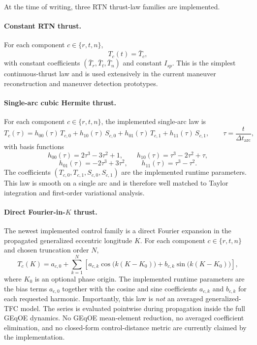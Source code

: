 \documentclass[11pt]{article}
\begin{document}
At the time of writing, three RTN thrust-law families are implemented.

\paragraph{Constant RTN thrust.}
For each component $c\in\{r,t,n\}$,
\begin{equation}
    T_c(t) = \bar{T}_c,
\end{equation}
with constant coefficients $(\bar{T}_r,\bar{T}_t,\bar{T}_n)$ and constant
$I_{sp}$. This is the simplest continuous-thrust law and is used extensively in
the current maneuver reconstruction and maneuver detection prototypes.

\paragraph{Single-arc cubic Hermite thrust.}
For each component $c\in\{r,t,n\}$, the implemented single-arc law is
\begin{equation}
    T_c(\tau)
    =
    h_{00}(\tau)\,T_{c,0}
    +
    h_{10}(\tau)\,S_{c,0}
    +
    h_{01}(\tau)\,T_{c,1}
    +
    h_{11}(\tau)\,S_{c,1},
    \qquad
    \tau = \frac{t}{\Delta t_{\mathrm{arc}}},
\end{equation}
with basis functions
\begin{equation}
    h_{00}(\tau)=2\tau^3-3\tau^2+1,
    \qquad
    h_{10}(\tau)=\tau^3-2\tau^2+\tau,
\end{equation}
\begin{equation}
    h_{01}(\tau)=-2\tau^3+3\tau^2,
    \qquad
    h_{11}(\tau)=\tau^3-\tau^2.
\end{equation}
The coefficients $(T_{c,0},T_{c,1},S_{c,0},S_{c,1})$ are the implemented
runtime parameters. This law is smooth on a single arc and is therefore well
matched to Taylor integration and first-order variational analysis.

\paragraph{Direct Fourier-in-$K$ thrust.}
The newest implemented control family is a direct Fourier expansion in the
propagated generalized eccentric longitude $K$. For each component
$c\in\{r,t,n\}$ and chosen truncation order $N$,
\begin{equation}
    T_c(K)
    =
    a_{c,0}
    +
    \sum_{k=1}^{N}
    \left[
        a_{c,k}\cos\!\big(k(K-K_0)\big)
        +
        b_{c,k}\sin\!\big(k(K-K_0)\big)
    \right],
\end{equation}
where $K_0$ is an optional phase origin. The implemented runtime parameters are
the bias terms $a_{c,0}$ together with the cosine and sine coefficients
$a_{c,k}$ and $b_{c,k}$ for each requested harmonic. Importantly, this law is
\emph{not} an averaged generalized-TFC model. The series is evaluated
pointwise during propagation inside the full GEqOE dynamics. No GEqOE
mean-element reduction, no averaged coefficient elimination, and no closed-form
control-distance metric are currently claimed by the implementation.
\end{document}
